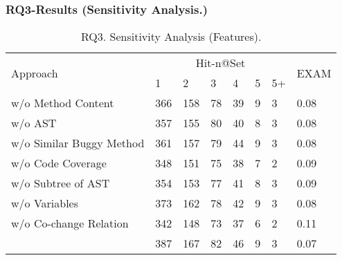 \subsubsection{RQ3-Results ({\bf Sensitivity Analysis.})}



\begin{table}[h]
	\caption{RQ3. Sensitivity Analysis (Features).}
	{\small
		\begin{center}
			\renewcommand{\arraystretch}{1}
			\begin{tabular}{p{3.3cm}|p{0.3cm}<{\centering}|p{0.3cm}<{\centering}|p{0.3cm}<{\centering}|p{0.3cm}<{\centering}|p{0.3cm}<{\centering}|p{0.3cm}<{\centering}|p{0.7cm}<{\centering}}
				\hline
				\multirow{2}{*}{Approach}    & \multicolumn{6}{c|}{Hit-n@Set}& \multirow{2}{*}{EXAM}\\
				\cline{2-7}
				&1&2&3&4&5&5+&\\
				
				\hline 
				w/o Method Content              & 366 & 158 & 78  & 39 & 9 & 3   & 0.08\\
				w/o	AST	                        & 357 & 155 & 80  & 40 & 8 & 3   & 0.08\\
				w/o Similar Buggy Method    	& 361 & 157 & 79  & 44 & 9 & 3   & 0.08\\
				w/o Code Coverage               & 348 & 151 & 75  & 38 & 7 & 2   & 0.09\\
				w/o	Subtree of AST  	        & 354 & 153 & 77  & 41 & 8 & 3   & 0.09\\
				w/o Variables               	& 373 & 162 & 78  & 42 & 9 & 3   & 0.08\\
				w/o Co-change Relation          & 342 & 148 & 73  & 37 & 6 & 2   & 0.11\\
				\hline
				\tool                           & 387 & 167 & 82  & 46 & 9 & 3   & 0.07\\
				\hline
			\end{tabular}
			
			\label{fig:rq3-1}
		\end{center}
	}
\end{table}

